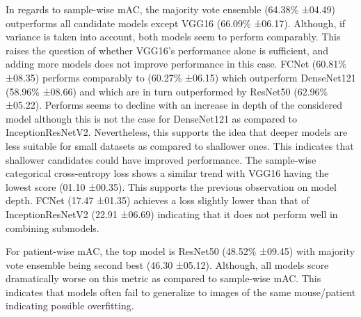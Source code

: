 \documentclass[
]{article}
\begin{document}
In regards to sample-wise mAC, the majority vote ensemble (64.38\%
±04.49) outperforms all candidate models except VGG16 (66.09\% ±06.17).
Although, if variance is taken into account, both models seem to perform
comparably. This raises the question of whether VGG16's performance
alone is sufficient, and adding more models does not improve performance
in this case. FCNet (60.81\% ±08.35) performs comparably to (60.27\%
±06.15) which outperform DenseNet121 (58.96\% ±08.66) and which are in
turn outperformed by ResNet50 (62.96\% ±05.22). Performs seems to
decline with an increase in depth of the considered model although this
is not the case for DenseNet121 as compared to InceptionResNetV2.
Nevertheless, this supports the idea that deeper models are less
suitable for small datasets as compared to shallower ones. This
indicates that shallower candidates could have improved performance. The
sample-wise categorical cross-entropy loss shows a similar trend with
VGG16 having the lowest score (01.10 ±00.35). This supports the previous
observation on model depth. FCNet (17.47 ±01.35) achieves a loss
slightly lower than that of InceptionResNetV2 (22.91 ±06.69) indicating
that it does not perform well in combining submodels.

For patient-wise mAC, the top model is ResNet50 (48.52\% ±09.45) with
majority vote ensemble being second best (46.30 ±05.12). Although, all
models score dramatically worse on this metric as compared to
sample-wise mAC. This indicates that models often fail to generalize to
images of the same mouse/patient indicating possible overfitting.
\end{document}
